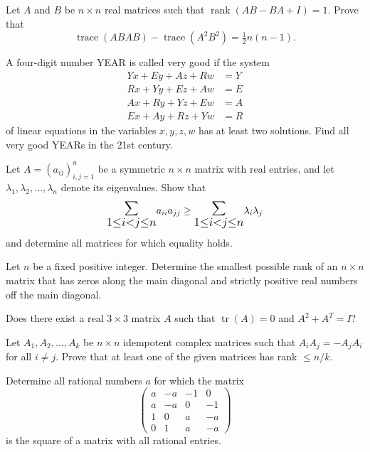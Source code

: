\documentclass[12pt]{article}
\let\oldsum\sum
\renewcommand{\sum}{\mathlarger{\mathlarger{\oldsum}}}
\begin{document}
\begin{problem}
Let $A$ and $B$ be $n\times n$ real matrices such that $\operatorname{rank}(AB-BA+I)=1$. Prove that
\[
\operatorname{trace}(ABAB) - \operatorname{trace}(A^2B^2) = \tfrac12 n(n-1).
\]
\end{problem}

\begin{problem}
A four-digit number YEAR is called very good if the system
\[
\begin{aligned}
Yx+Ey+Az+Rw &= Y\\
Rx+Yy+Ez+Aw &= E\\
Ax+Ry+Yz+Ew &= A\\
Ex+Ay+Rz+Yw &= R
\end{aligned}
\]
of linear equations in the variables $x,y,z,w$ has at least two solutions. Find all very good YEARs in the 21st century.
\end{problem}

\begin{problem}
Let $A=(a_{ij})_{i,j=1}^n$ be a symmetric $n\times n$ matrix with real entries, and let $\lambda_1,\lambda_2,\dots,\lambda_n$ denote its eigenvalues. Show that
\[
\sum_{1\le i<j\le n} a_{ii}a_{jj} \ge \sum_{1\le i<j\le n}\lambda_i\lambda_j
\]
and determine all matrices for which equality holds.
\end{problem}

\begin{problem}
Let $n$ be a fixed positive integer. Determine the smallest possible rank of an $n\times n$ matrix that has zeros along the main diagonal and strictly positive real numbers off the main diagonal.
\end{problem}

\begin{problem}
Does there exist a real $3\times 3$ matrix $A$ such that $\operatorname{tr}(A)=0$ and $A^2+A^T=I$?
\end{problem}

\begin{problem}
Let $A_1,A_2,\dots,A_k$ be $n\times n$ idempotent complex matrices such that $A_iA_j=-A_jA_i$ for all $i\ne j$. Prove that at least one of the given matrices has rank $\le n/k$.
\end{problem}

\begin{problem}
Determine all rational numbers $a$ for which the matrix
\[
\begin{pmatrix} a & -a & -1 & 0\\ a & -a & 0 & -1\\ 1 & 0 & a & -a\\ 0 & 1 & a & -a\end{pmatrix}
\]
is the square of a matrix with all rational entries.
\end{problem}
\end{document}
